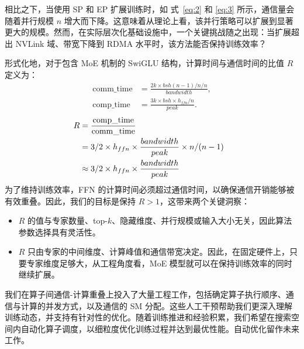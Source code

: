 相比之下，当使用 SP 和 EP 扩展训练时，如 式~\ref{eq:2} 和 \ref{eq:3} 所示，通信量会随着并行规模 $n$ 增大而下降。这意味着从理论上看，该并行策略可以扩展到显著更大的规模。然而，在实际层次化基础设施中，一个关键挑战随之出现：当扩展超出 NVLink 域、带宽下降到 RDMA 水平时，该方法能否保持训练效率？

形式化地，对于包含 MoE 机制的 SwiGLU 结构，计算时间与通信时间的比值 $R$ 定义为：
\begin{align}
    \text{comm\_time} & = \frac{2k \times bsh(n-1)/n /n}{bandwidth}, \\
    \text{comp\_time} & = \frac{3k \times bsh \times h_{ffn}/n}{peak}.
\end{align}
\begin{align}
    \hspace{-3cm} R &= \frac{\text{comp\_time}}{\text{comm\_time}} \\
    &= 3/2\times h_{ffn}\times \frac{bandwidth}{peak} \times n/(n-1) \\
    & \approx  3/2 \times h_{ffn} \times \frac{bandwidth}{peak}
\end{align}
为了维持训练效率，FFN 的计算时间必须超过通信时间，以确保通信开销能够被有效重叠。因此，我们的目标是保持 $R > 1$，这带来两个关键洞察：
\begin{itemize}[leftmargin=*]
    \item $R$ 的值与专家数量、top-$k$、隐藏维度、并行规模或输入大小无关，因此算法参数选择具有灵活性。
    \item $R$ 只由专家的中间维度、计算峰值和通信带宽决定。因此，在固定硬件上，只要专家维度足够大，从工程角度看，MoE 模型就可以在保持训练效率的同时继续扩展。
\end{itemize}

 我们在算子间通信-计算重叠上投入了大量工程工作，包括确定算子执行顺序、通信与计算的并发方式，以及通信的 SM 分配。这些人工干预帮助我们更深入理解训练动态，并支持有针对性的优化。随着训练推进和经验积累，我们希望在搜索空间内自动化算子调度，以细粒度优化训练过程并达到最优性能。自动优化留作未来工作。

 

